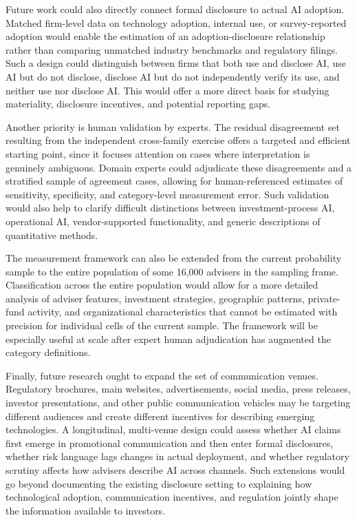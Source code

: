 \documentclass[utf8]{FrontiersinHarvard}
\begin{document}
Future work could also directly connect formal disclosure to actual AI adoption. Matched firm-level data on technology adoption, internal use, or survey-reported adoption would enable the estimation of an adoption-disclosure relationship rather than comparing unmatched industry benchmarks and regulatory filings. Such a design could distinguish between firms that both use and disclose AI, use AI but do not disclose, disclose AI but do not independently verify its use, and neither use nor disclose AI. This would offer a more direct basis for studying materiality, disclosure incentives, and potential reporting gaps.

Another priority is human validation by experts. The residual disagreement set resulting from the independent cross-family exercise offers a targeted and efficient starting point, since it focuses attention on cases where interpretation is genuinely ambiguous. Domain experts could adjudicate these disagreements and a stratified sample of agreement cases, allowing for human-referenced estimates of sensitivity, specificity, and category-level measurement error. Such validation would also help to clarify difficult distinctions between investment-process AI, operational AI, vendor-supported functionality, and generic descriptions of quantitative methods.

The measurement framework can also be extended from the current probability sample to the entire population of some 16{,}000 advisers in the sampling frame. Classification across the entire population would allow for a more detailed analysis of adviser features, investment strategies, geographic patterns, private-fund activity, and organizational characteristics that cannot be estimated with precision for individual cells of the current sample. The framework will be especially useful at scale after expert human adjudication has augmented the category definitions.

Finally, future research ought to expand the set of communication venues. Regulatory brochures, main websites, advertisements, social media, press releases, investor presentations, and other public communication vehicles may be targeting different audiences and create different incentives for describing emerging technologies. A longitudinal, multi-venue design could assess whether AI claims first emerge in promotional communication and then enter formal disclosures, whether risk language lags changes in actual deployment, and whether regulatory scrutiny affects how advisers describe AI across channels. Such extensions would go beyond documenting the existing disclosure setting to explaining how technological adoption, communication incentives, and regulation jointly shape the information available to investors.
\end{document}
